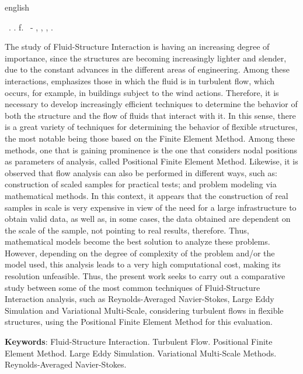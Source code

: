 \begin{resumo}[Abstract]
    \begin{otherlanguage*}{english}
        \begin{flushleft}
            \setlength{\absparsep}{0pt} %
            \SingleSpacing
            \Autorabr\ \textbf{\Title}.	\the\year. \pageref{LastPage}f.
            \Typeofwork\ - \Unidademin, \Universidade, \Local, \the\year.
        \end{flushleft}
        \OnehalfSpacing

        The study of Fluid-Structure Interaction is having an increasing degree of importance, since the structures are becoming increasingly lighter and slender, due to the constant advances in the different areas of engineering. Among these interactions, emphasizes those in which the fluid is in turbulent flow, which occurs, for example, in buildings subject to the wind actions. Therefore, it is necessary to develop increasingly efficient techniques to determine the behavior of both the structure and the flow of fluids that interact with it. In this sense, there is a great variety of techniques for determining the behavior of flexible structures, the most notable being those based on the Finite Element Method. Among these methods, one that is gaining prominence is the one that considers nodal positions as parameters of analysis, called Positional Finite Element Method. Likewise, it is observed that flow analysis can also be performed in different ways, such as: construction of scaled samples for practical tests; and problem modeling via mathematical methods. In this context, it appears that the construction of real samples in scale is very expensive in view of the need for a large infrastructure to obtain valid data, as well as, in some cases, the data obtained are dependent on the scale of the sample, not pointing to real results, therefore. Thus, mathematical models become the best solution to analyze these problems. However, depending on the degree of complexity of the problem and/or the model used, this analysis leads to a very high computational cost, making its resolution unfeasible. Thus, the present work seeks to carry out a comparative study between some of the most common techniques of Fluid-Structure Interaction analysis, such as Reynolds-Averaged Navier-Stokes, Large Eddy Simulation and Variational Multi-Scale, considering turbulent flows in flexible structures, using the Positional Finite Element Method for this evaluation.

        \textbf{Keywords}: Fluid-Structure Interaction. Turbulent Flow. Positional Finite Element Method. Large Eddy Simulation. Variational Multi-Scale Methods. Reynolds-Averaged Navier-Stokes.
    \end{otherlanguage*}
\end{resumo}